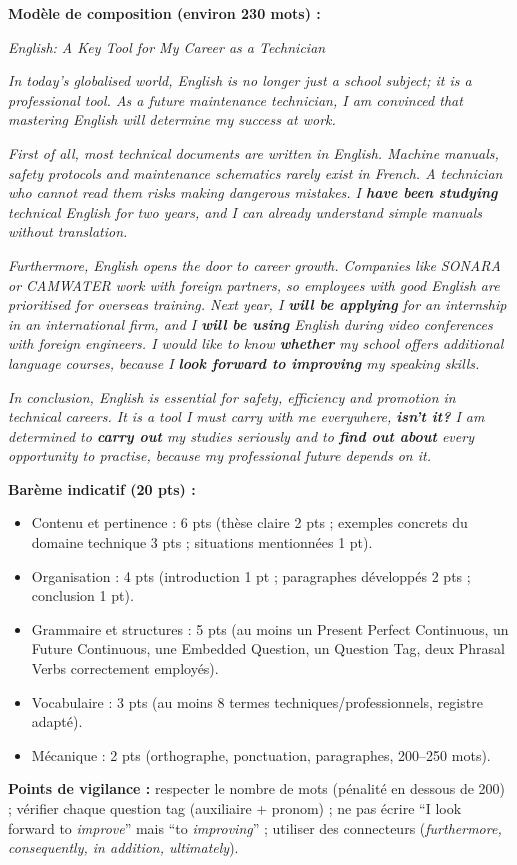 \documentclass[11pt]{article}
\newcommand{\cle}[1]{{\popxbold\color{popdark}#1}}
\begin{document}
\begin{corrige}
\textbf{Modèle de composition (environ 230 mots) :}

\emph{English: A Key Tool for My Career as a Technician}

\emph{In today's globalised world, English is no longer just a school subject; it is a professional tool. As a future maintenance technician, I am convinced that mastering English will determine my success at work.}

\emph{First of all, most technical documents are written in English. Machine manuals, safety protocols and maintenance schematics rarely exist in French. A technician who cannot read them risks making dangerous mistakes. I \textbf{have been studying} technical English for two years, and I can already understand simple manuals without translation.}

\emph{Furthermore, English opens the door to career growth. Companies like SONARA or CAMWATER work with foreign partners, so employees with good English are prioritised for overseas training. Next year, I \textbf{will be applying} for an internship in an international firm, and I \textbf{will be using} English during video conferences with foreign engineers. I would like to know \textbf{whether} my school offers additional language courses, because I \textbf{look forward to improving} my speaking skills.}

\emph{In conclusion, English is essential for safety, efficiency and promotion in technical careers. It is a tool I must carry with me everywhere, \textbf{isn't it?} I am determined to \textbf{carry out} my studies seriously and to \textbf{find out about} every opportunity to practise, because my professional future depends on it.}

\textbf{Barème indicatif (20 pts) :}
\begin{itemize}
    \item Contenu et pertinence : 6 pts (thèse claire 2 pts ; exemples concrets du domaine technique 3 pts ; situations mentionnées 1 pt).
    \item Organisation : 4 pts (introduction 1 pt ; paragraphes développés 2 pts ; conclusion 1 pt).
    \item Grammaire et structures : 5 pts (au moins un \cle{Present Perfect Continuous}, un \cle{Future Continuous}, une \cle{Embedded Question}, un \cle{Question Tag}, deux \cle{Phrasal Verbs} correctement employés).
    \item Vocabulaire : 3 pts (au moins 8 termes techniques/professionnels, registre adapté).
    \item Mécanique : 2 pts (orthographe, ponctuation, paragraphes, 200--250 mots).
\end{itemize}
\textbf{Points de vigilance :} respecter le nombre de mots (pénalité en dessous de 200) ; vérifier chaque question tag (auxiliaire + pronom) ; ne pas écrire ``I look forward to \emph{improve}'' mais ``to \emph{improving}'' ; utiliser des connecteurs (\emph{furthermore, consequently, in addition, ultimately}).
\end{corrige}
\end{document}

